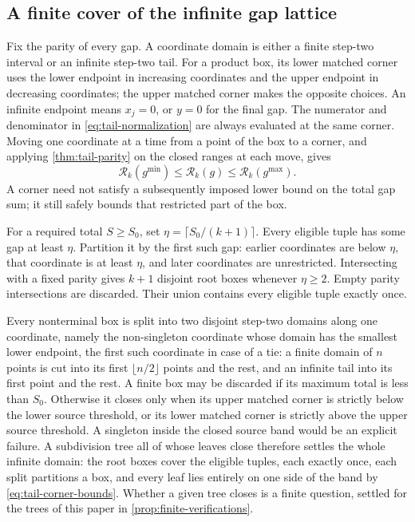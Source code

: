 \subsection{A finite cover of the infinite gap lattice}

Fix the parity of every gap. A coordinate domain is either a finite
step-two interval or an infinite step-two tail. For a product box, its
lower matched corner uses the lower endpoint in increasing coordinates
and the upper endpoint in decreasing coordinates; the upper matched
corner makes the opposite choices. An infinite endpoint means $x_j=0$, or
$y=0$ for the final gap. The numerator and denominator in
\eqref{eq:tail-normalization} are always evaluated at the same corner.
Moving one coordinate at a time from a point of the box to a corner, and
applying \cref{thm:tail-parity} on the closed ranges at each move, gives
\begin{equation}
 \mathcal R_k(g^{\min})\leqslant\mathcal R_k(g)
 \leqslant\mathcal R_k(g^{\max}).
 \label{eq:tail-corner-bounds}
\end{equation}
A corner need not satisfy a subsequently imposed lower bound on the total
gap sum; it still safely bounds that restricted part of the box.

For a required total $S\geqslant S_0$, set
$\eta=\lceil S_0/(k+1)\rceil$. Every eligible tuple has some gap at least
$\eta$. Partition it by the first such gap: earlier coordinates are below
$\eta$, that coordinate is at least $\eta$, and later coordinates are
unrestricted. Intersecting with a fixed parity gives $k+1$ disjoint root
boxes whenever $\eta\geqslant2$. Empty parity intersections are discarded.
Their union contains every eligible tuple exactly once.

Every nonterminal box is split into two disjoint step-two domains along
one coordinate, namely the non-singleton coordinate whose domain has the
smallest lower endpoint, the first such coordinate in case of a tie: a finite
domain of $n$ points is cut into its first $\lfloor n/2\rfloor$ points and the
rest, and an infinite tail into its first point and the rest.
A finite box may be discarded if its maximum total is
less than $S_0$. Otherwise it closes only when its upper matched corner
is strictly below the lower source threshold, or its lower matched corner
is strictly above the upper source threshold. A singleton inside the
closed source band would be an explicit failure. A subdivision tree all of
whose leaves close therefore settles the whole infinite domain: the root
boxes cover the eligible tuples, each exactly once, each split partitions a
box, and every leaf lies entirely on one side of the band by
\eqref{eq:tail-corner-bounds}.
Whether a given tree closes is a finite question, settled for the trees of
this paper in \cref{prop:finite-verifications}.

